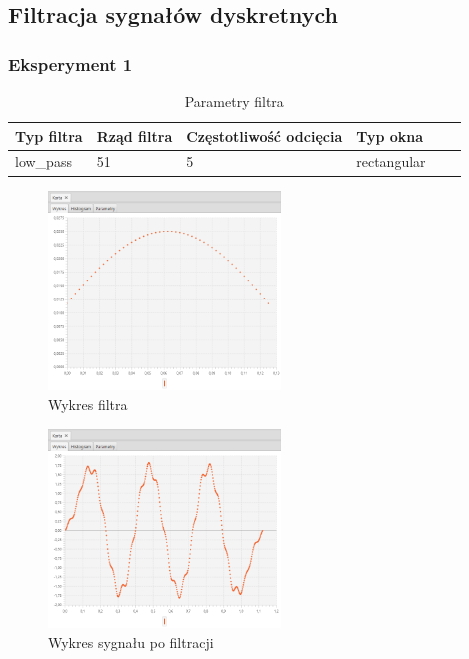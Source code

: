 \documentclass[12pt]{article}
\begin{document}
{        \subsection{Filtracja sygnałów dyskretnych} {

            \subsubsection{Eksperyment 1} {
                \begin{table}[H]
                \centering
                \begin{tabular}{|l|l|l|l|l|l|}
                \hline
                Typ filtra & Rząd filtra & Częstotliwość odcięcia & Typ okna  \\\hline
                low\_pass & 51 & 5 & rectangular     \\\hline
                \end{tabular}
                \caption{Parametry filtra}
                \end{table}
                \begin{figure}[H]
                \centering
                \includegraphics[width=0.55\textwidth]{img/result/filter/experiment01/data_draw_1a_filter_data_115323.png}
                \caption{Wykres filtra}
                \end{figure}

                \begin{figure}[H]
                \centering
                \includegraphics[width=0.55\textwidth]{img/result/filter/experiment01/data_draw_1a_result_data_115329.png}
                \caption{Wykres sygnału po filtracji}
                \end{figure}
            }
            \newpage

}}
\end{document}
